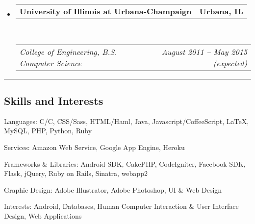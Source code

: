 \documentclass[10pt,letterpaper]{article}
\makeatletter
\newcommand{\headerrow}[2]
{\begin{tabular*}{\linewidth}{l@{\extracolsep{\fill}}r}
	#1 &
	#2 \\
\end{tabular*}}
\newcommand{\CPP}
{C\nolinebreak[4]\hspace{-.05em}\raisebox{.22ex}{\footnotesize\bf ++}}
\makeatother
\begin{document}
\begin{itemize}
	\parskip=0.1em

	\item 
	\headerrow
		{\textbf{University of Illinois at Urbana-Champaign}}
		{\textbf{Urbana, IL}}
	\\
	\headerrow
		{\emph{College of Engineering, B.S. Computer Science}}
		{\emph{August 2011 -- May 2015 (expected)}}

\end{itemize}


\hrule
\vspace{-0.4em}
\subsection*{Skills and Interests}

\begin{description*}
	\item[Languages:]
       C/\CPP, CSS/Sass, HTML/Haml, Java, Javascript/CoffeeScript, \LaTeX, MySQL, PHP, Python, Ruby
	\item[Services:]
	Amazon Web Service, Google App Engine, Heroku
	\item[Frameworks & Libraries:]
	Android SDK, CakePHP, CodeIgniter, Facebook SDK, Flask, jQuery, Ruby on Rails, Sinatra, webapp2
	\item[Graphic Design:]
	Adobe Illustrator, Adobe Photoshop, UI \& Web Design
	\item[Interests:]
	Android, Databases, Human Computer Interaction \& User Interface Design, Web 
	Applications
\end{description*}
\end{document}
